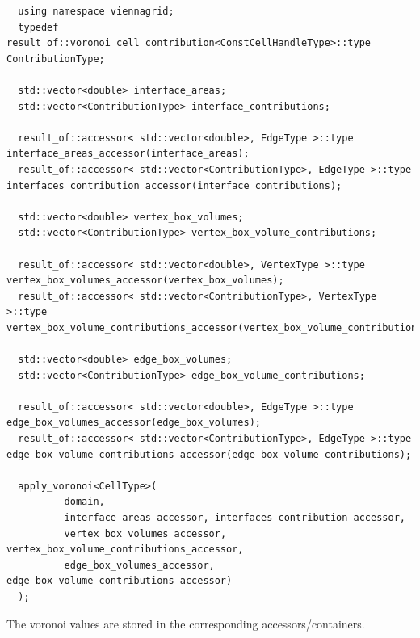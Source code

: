  \begin{lstlisting}
  using namespace viennagrid;
  typedef result_of::voronoi_cell_contribution<ConstCellHandleType>::type ContributionType;
 
  std::vector<double> interface_areas;
  std::vector<ContributionType> interface_contributions;
  
  result_of::accessor< std::vector<double>, EdgeType >::type interface_areas_accessor(interface_areas);
  result_of::accessor< std::vector<ContributionType>, EdgeType >::type interfaces_contribution_accessor(interface_contributions);
  
  std::vector<double> vertex_box_volumes;
  std::vector<ContributionType> vertex_box_volume_contributions;
  
  result_of::accessor< std::vector<double>, VertexType >::type vertex_box_volumes_accessor(vertex_box_volumes);
  result_of::accessor< std::vector<ContributionType>, VertexType >::type vertex_box_volume_contributions_accessor(vertex_box_volume_contributions);
  
  std::vector<double> edge_box_volumes;
  std::vector<ContributionType> edge_box_volume_contributions;
  
  result_of::accessor< std::vector<double>, EdgeType >::type edge_box_volumes_accessor(edge_box_volumes);
  result_of::accessor< std::vector<ContributionType>, EdgeType >::type edge_box_volume_contributions_accessor(edge_box_volume_contributions);
  
  apply_voronoi<CellType>(
          domain,
          interface_areas_accessor, interfaces_contribution_accessor,
          vertex_box_volumes_accessor, vertex_box_volume_contributions_accessor,
          edge_box_volumes_accessor, edge_box_volume_contributions_accessor)
  );
 \end{lstlisting}
 
 The voronoi values are stored in the corresponding accessors/containers.
